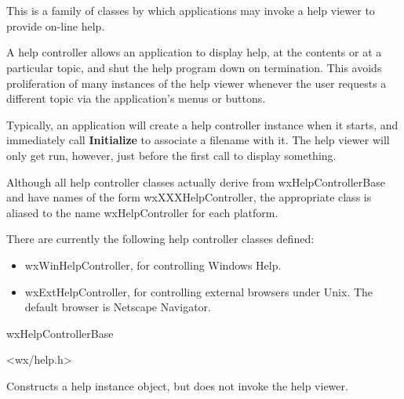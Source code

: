 \section{}\label{wxhelpcontroller}

This is a family of classes by which
applications may invoke a help viewer to provide on-line help.

A help controller allows an application to display help, at the contents
or at a particular topic, and shut the help program down on termination.
This avoids proliferation of many instances of the help viewer whenever the
user requests a different topic via the application's menus or buttons.

Typically, an application will create a help controller instance
when it starts, and immediately call {\bf Initialize}\rtfsp
to associate a filename with it. The help viewer will only get run, however,
just before the first call to display something.

Although all help controller classes actually derive from wxHelpControllerBase and have
names of the form wxXXXHelpController, the
appropriate class is aliased to the name wxHelpController for each platform.

There are currently the following help controller classes defined:

\begin{itemize}\itemsep=0pt
\item wxWinHelpController, for controlling Windows Help.
\item wxExtHelpController, for controlling external browsers under Unix.
The default browser is Netscape Navigator.
\end{itemize}


wxHelpControllerBase\\


<wx/help.h>




Constructs a help instance object, but does not invoke the help viewer.




